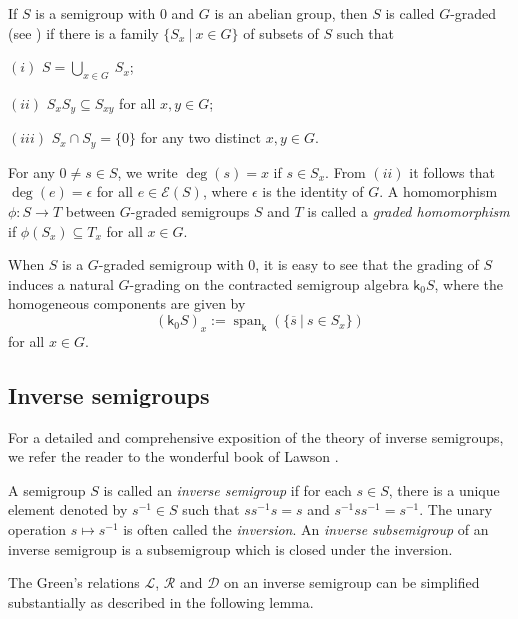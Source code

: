 \documentclass[a4paper,reqno,11pt]{amsart}
\numberwithin{equation}{section}
\theoremstyle{definition}
\theoremstyle{remark}
\newcommand{\lspan}{\operatorname{span}}
\begin{document}
If $S$ is a semigroup with $0$ and $G$ is an abelian group, then $S$ is called $G$-graded (see \cite[Definition 2.1]{HazMes}) if there is a family $\{S_x~|~x\in G\}$ of subsets of $S$ such that 

$(i)$ $S=\displaystyle{\bigcup_{x\in G}}~S_x$;

$(ii)$ $S_x S_y\subseteq S_{xy}$ for all $x,y\in G$;

$(iii)$ $S_x\cap S_y=\{0\}$ for any two distinct $x,y\in G$.

For any $0\neq s\in S$, we write $\deg(s)=x$ if $s\in S_x$. From $(ii)$ it follows that $\deg(e)=\epsilon$ for all $e\in \mathcal{E}(S)$, where $\epsilon$ is the identity of $G$. A homomorphism $\phi:S\longrightarrow T$ between $G$-graded semigroups $S$ and $T$ is called a \emph{graded homomorphism} if $\phi(S_x)\subseteq T_x$ for all $x\in G$. 

When $S$ is a $G$-graded semigroup with $0$, it is easy to see that the grading of $S$ induces a natural $G$-grading on the contracted semigroup algebra $\mathsf{k}_0S$, where the homogeneous components are given by \[(\mathsf{k}_0S)_x:=\lspan_\mathsf{k}\left(\{\overline{s}~|~s\in S_x\}\right)\] for all $x\in G$. 

\subsection{Inverse semigroups}\label{ssec invsem}
For a detailed and comprehensive exposition of the theory of inverse semigroups, we refer the reader to the wonderful book of Lawson \cite{Lawson}. 

A semigroup $S$ is called an \emph{inverse semigroup} if for each $s\in S$, there is a unique element denoted by $s^{-1}\in S$ such that $ss^{-1}s=s$ and $s^{-1}ss^{-1}=s^{-1}$. The unary operation $s\longmapsto s^{-1}$ is often called the \emph{inversion}. An \emph{inverse subsemigroup} of an inverse semigroup is a subsemigroup which is closed under the inversion. 

The Green's relations $\mathscr{L}$, $\mathscr{R}$ and $\mathscr{D}$ on an inverse semigroup can be simplified substantially as described in the following lemma.
\end{document}
